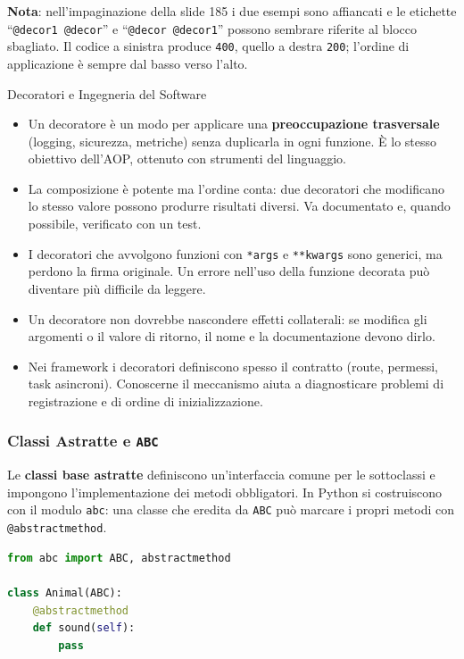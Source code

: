 \documentclass[12pt]{extarticle}
\begin{document}
\noindent \textbf{Nota}: nell'impaginazione della slide 185 i due esempi sono affiancati e le etichette ``\texttt{@decor1 @decor}'' e ``\texttt{@decor @decor1}'' possono sembrare riferite al blocco sbagliato. Il codice a sinistra produce \texttt{400}, quello a destra \texttt{200}; l'ordine di applicazione è sempre dal basso verso l'alto.

\begin{cbox}{Decoratori e Ingegneria del Software}
\begin{itemize}
    \item Un decoratore è un modo per applicare una \textbf{preoccupazione trasversale} (logging, sicurezza, metriche) senza duplicarla in ogni funzione. È lo stesso obiettivo dell'AOP, ottenuto con strumenti del linguaggio.
    \item La composizione è potente ma l'ordine conta: due decoratori che modificano lo stesso valore possono produrre risultati diversi. Va documentato e, quando possibile, verificato con un test.
    \item I decoratori che avvolgono funzioni con \texttt{*args} e \texttt{**kwargs} sono generici, ma perdono la firma originale. Un errore nell'uso della funzione decorata può diventare più difficile da leggere.
    \item Un decoratore non dovrebbe nascondere effetti collaterali: se modifica gli argomenti o il valore di ritorno, il nome e la documentazione devono dirlo.
    \item Nei framework i decoratori definiscono spesso il contratto (route, permessi, task asincroni). Conoscerne il meccanismo aiuta a diagnosticare problemi di registrazione e di ordine di inizializzazione.
\end{itemize}
\end{cbox}

\subsubsection{Classi Astratte e \texttt{ABC}}

\noindent Le \textbf{classi base astratte} definiscono un'interfaccia comune per le sottoclassi e impongono l'implementazione dei metodi obbligatori. In Python si costruiscono con il modulo \texttt{abc}: una classe che eredita da \texttt{ABC} può marcare i propri metodi con \texttt{@abstractmethod}.

\begin{lstlisting}[language=Python]
from abc import ABC, abstractmethod

class Animal(ABC):
    @abstractmethod
    def sound(self):
        pass
\end{lstlisting}
\end{document}
